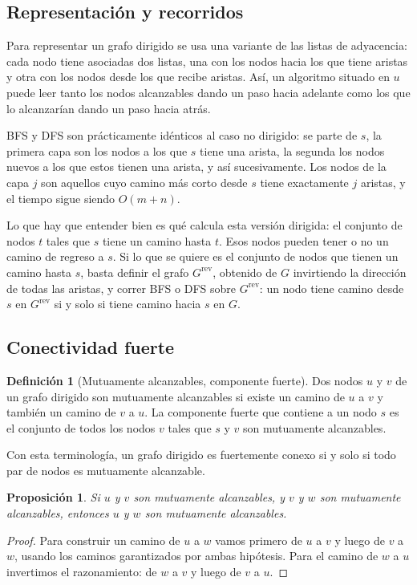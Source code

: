 \documentclass[12pt, spanish, oneside, openany]{book}
\theoremstyle{uprightplain}
\newtheorem{proposicion}[teorema]{Proposición}
\theoremstyle{definition}
\newtheorem{definicion}[teorema]{Definición}
\theoremstyle{remark}
\theoremstyle{definition}
\begin{document}
\subsection{Representación y recorridos}

Para representar un grafo dirigido se usa una variante de las listas de adyacencia: cada nodo tiene asociadas dos listas, una con los nodos hacia los que tiene aristas y otra con los nodos desde los que recibe aristas. Así, un algoritmo situado en $u$ puede leer tanto los nodos alcanzables dando un paso hacia adelante como los que lo alcanzarían dando un paso hacia atrás.

BFS y DFS son prácticamente idénticos al caso no dirigido: se parte de $s$, la primera capa son los nodos a los que $s$ tiene una arista, la segunda los nodos nuevos a los que estos tienen una arista, y así sucesivamente. Los nodos de la capa $j$ son aquellos cuyo camino más corto desde $s$ tiene exactamente $j$ aristas, y el tiempo sigue siendo $O(m+n)$.

Lo que hay que entender bien es qué calcula esta versión dirigida: el conjunto de nodos $t$ tales que $s$ tiene un camino hasta $t$. Esos nodos pueden tener o no un camino de regreso a $s$. Si lo que se quiere es el conjunto de nodos que tienen un camino hasta $s$, basta definir el grafo $G^{\text{rev}}$, obtenido de $G$ invirtiendo la dirección de todas las aristas, y correr BFS o DFS sobre $G^{\text{rev}}$: un nodo tiene camino desde $s$ en $G^{\text{rev}}$ si y solo si tiene camino hacia $s$ en $G$.

\subsection{Conectividad fuerte}

\begin{definicion}[Mutuamente alcanzables, componente fuerte]
\label{def:mutuamente-alcanzables}
Dos nodos $u$ y $v$ de un grafo dirigido son mutuamente alcanzables si existe un camino de $u$ a $v$ y también un camino de $v$ a $u$. La componente fuerte que contiene a un nodo $s$ es el conjunto de todos los nodos $v$ tales que $s$ y $v$ son mutuamente alcanzables.
\end{definicion}

Con esta terminología, un grafo dirigido es fuertemente conexo si y solo si todo par de nodos es mutuamente alcanzable.

\begin{proposicion}
\label{prop:mutua-transitiva}
Si $u$ y $v$ son mutuamente alcanzables, y $v$ y $w$ son mutuamente alcanzables, entonces $u$ y $w$ son mutuamente alcanzables.
\end{proposicion}
\begin{proof}
Para construir un camino de $u$ a $w$ vamos primero de $u$ a $v$ y luego de $v$ a $w$, usando los caminos garantizados por ambas hipótesis. Para el camino de $w$ a $u$ invertimos el razonamiento: de $w$ a $v$ y luego de $v$ a $u$.
\end{proof}
\end{document}
